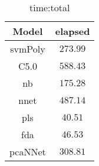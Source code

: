 \begin{table}[!ht]
	\centering
	\begin{tabular}{|c|c|}
		\hline
		Model & elapsed \\ \hline
		svmPoly & $273.99$ \\ \hline
		C5.0 & $588.43$ \\ \hline
		nb & $175.28$ \\ \hline
		nnet & $487.14$ \\ \hline
		pls & $40.51$ \\ \hline
		fda & $46.53$ \\ \hline
		pcaNNet & $308.81$ \\ \hline
	\end{tabular}
	\caption{time:total}
	\label{tab:time:total}
\end{table}
